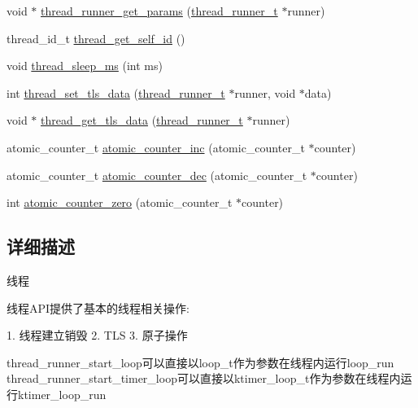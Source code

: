 \begin{DoxyCompactItemize}
void $\ast$ \hyperlink{group__thread_gaf67fa2b2cfefc2de422a31b9dfad2bca}{thread\+\_\+runner\+\_\+get\+\_\+params} (\hyperlink{struct__thread__runner__t}{thread\+\_\+runner\+\_\+t} $\ast$runner)
\item 
thread\+\_\+id\+\_\+t \hyperlink{group__thread_gaecf10907eee00ec0e807271c906a6645}{thread\+\_\+get\+\_\+self\+\_\+id} ()
\item 
void \hyperlink{group__thread_gabddf3ac30aac3f22f8c53b7517e6eb35}{thread\+\_\+sleep\+\_\+ms} (int ms)
\item 
int \hyperlink{group__thread_gaa187b2cd2c906680890fb4ea2833d665}{thread\+\_\+set\+\_\+tls\+\_\+data} (\hyperlink{struct__thread__runner__t}{thread\+\_\+runner\+\_\+t} $\ast$runner, void $\ast$data)
\item 
void $\ast$ \hyperlink{group__thread_ga63c9be5b8fb04c0b26382f51b7bdf237}{thread\+\_\+get\+\_\+tls\+\_\+data} (\hyperlink{struct__thread__runner__t}{thread\+\_\+runner\+\_\+t} $\ast$runner)
\item 
atomic\+\_\+counter\+\_\+t \hyperlink{group__thread_gade4f41f1cd519f2719b5114ce7801232}{atomic\+\_\+counter\+\_\+inc} (atomic\+\_\+counter\+\_\+t $\ast$counter)
\item 
atomic\+\_\+counter\+\_\+t \hyperlink{group__thread_gafc2df03d75cf9168b72e8c5e11953437}{atomic\+\_\+counter\+\_\+dec} (atomic\+\_\+counter\+\_\+t $\ast$counter)
\item 
int \hyperlink{group__thread_ga141897cac9743394a99ff7780daa6a80}{atomic\+\_\+counter\+\_\+zero} (atomic\+\_\+counter\+\_\+t $\ast$counter)
\end{DoxyCompactItemize}


\subsection{详细描述}

\begin{DoxyPre}
线程\end{DoxyPre}



\begin{DoxyPre}线程API提供了基本的线程相关操作:\end{DoxyPre}



\begin{DoxyPre}1. 线程建立销毁
2. TLS
3. 原子操作\end{DoxyPre}



\begin{DoxyPre}thread\_runner\_start\_loop可以直接以loop\_t作为参数在线程内运行loop\_run
thread\_runner\_start\_timer\_loop可以直接以ktimer\_loop\_t作为参数在线程内运行ktimer\_loop\_run\end{DoxyPre}



